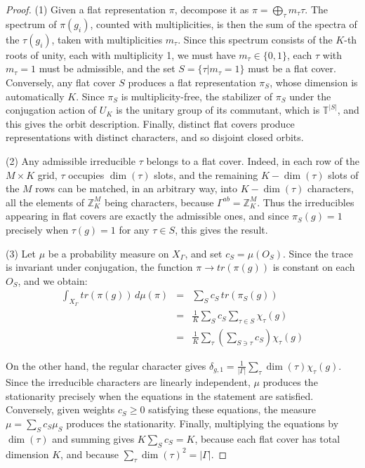 \documentclass[12pt]{amsart}
\theoremstyle{definition}
\begin{document}
\begin{proof}
(1) Given a flat representation $\pi$, decompose it as $\pi=\bigoplus_\tau m_\tau\tau$. The spectrum of $\pi(g_i)$, counted with multiplicities, is then the sum of the spectra of the $\tau(g_i)$, taken with multiplicities $m_\tau$. Since this spectrum consists of the $K$-th roots of unity, each with multiplicity 1, we must have $m_\tau\in\{0,1\}$, each $\tau$ with $m_\tau=1$ must be admissible, and the set $S=\{\tau|m_\tau=1\}$ must be a flat cover. Conversely, any flat cover $S$ produces a flat representation $\pi_S$, whose dimension is automatically $K$. Since $\pi_S$ is multiplicity-free, the stabilizer of $\pi_S$ under the conjugation action of $U_K$ is the unitary group of its commutant, which is $\mathbb T^{|S|}$, and this gives the orbit description. Finally, distinct flat covers produce representations with distinct characters, and so disjoint closed orbits.

(2) Any admissible irreducible $\tau$ belongs to a flat cover. Indeed, in each row of the $M\times K$ grid, $\tau$ occupies $\dim(\tau)$ slots, and the remaining $K-\dim(\tau)$ slots of the $M$ rows can be matched, in an arbitrary way, into $K-\dim(\tau)$ characters, all the elements of $\mathbb Z_K^M$ being characters, because $\Gamma^{ab}=\mathbb Z_K^M$. Thus the irreducibles appearing in flat covers are exactly the admissible ones, and since $\pi_S(g)=1$ precisely when $\tau(g)=1$ for any $\tau\in S$, this gives the result.

(3) Let $\mu$ be a probability measure on $X_\Gamma$, and set $c_S=\mu(O_S)$. Since the trace is invariant under conjugation, the function $\pi\to tr(\pi(g))$ is constant on each $O_S$, and we obtain:
\begin{eqnarray*}
\int_{X_\Gamma}tr(\pi(g))\,d\mu(\pi)
&=&\sum_Sc_S\,tr(\pi_S(g))\\
&=&\frac{1}{K}\sum_Sc_S\sum_{\tau\in S}\chi_\tau(g)\\
&=&\frac{1}{K}\sum_\tau\left(\sum_{S\ni\tau}c_S\right)\chi_\tau(g)
\end{eqnarray*}

On the other hand, the regular character gives $\delta_{g,1}=\frac{1}{|\Gamma|}\sum_\tau\dim(\tau)\chi_\tau(g)$. Since the irreducible characters are linearly independent, $\mu$ produces the stationarity precisely when the equations in the statement are satisfied. Conversely, given weights $c_S\geq0$ satisfying these equations, the measure $\mu=\sum_Sc_S\mu_S$ produces the stationarity. Finally, multiplying the equations by $\dim(\tau)$ and summing gives $K\sum_Sc_S=K$, because each flat cover has total dimension $K$, and because $\sum_\tau\dim(\tau)^2=|\Gamma|$.
\end{proof}
\end{document}
